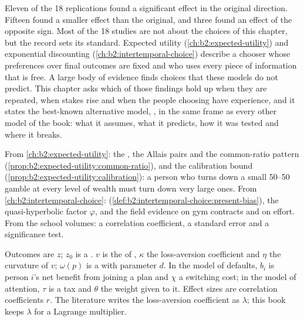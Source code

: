Eleven of the 18 replications found a significant effect in the original direction. Fifteen found a
smaller effect than the original, and three found an effect of the opposite sign. Most of the 18 studies
are not about the choices of this chapter, but the record sets its standard. Expected utility (\cref{ch:b2:expected-utility}) and exponential
discounting (\cref{ch:b2:intertemporal-choice}) describe a chooser whose preferences over final outcomes
are fixed and who uses every piece of information that is free. A large body of evidence finds choices
that these models do not predict. This chapter asks which of those findings hold up when they are
repeated, when stakes rise and when the people choosing have experience, and it states the best-known
alternative model, , in the same frame as every other model of the book: what it assumes,
what it predicts, how it was tested and where it breaks.

\begin{recall}
From \cref{ch:b2:expected-utility}: the , the Allais pairs and the common-ratio
pattern (\cref{prop:b2:expected-utility:common-ratio}), and the calibration bound
(\cref{prop:b2:expected-utility:calibration}): a person who turns down a small 50--50 gamble at every
level of wealth must turn down very large ones. From \cref{ch:b2:intertemporal-choice}: 
(\cref{def:b2:intertemporal-choice:present-bias}), the quasi-hyperbolic factor $\varphi$, and the field
evidence on gym contracts and on effort. From the school volumes: a correlation coefficient, a standard
error and a significance test.
\end{recall}

\begin{notation}\label{not:b2:behavioural-evidence:symbols}
Outcomes are $z$; $z_0$ is a . $v$ is the  of , $\kappa$ the
loss-aversion coefficient and $\eta$ the curvature of $v$; $\omega(p)$ is a  with parameter $d$. In the model of defaults, $b_i$ is person $i$'s net benefit from joining a
plan and $\chi$ a switching cost; in the model of attention, $\tau$ is a tax and $\theta$ the weight
given to it. Effect sizes are correlation coefficients $r$. The literature writes the loss-aversion
coefficient as $\lambda$; this book keeps $\lambda$ for a Lagrange multiplier.
\end{notation}


